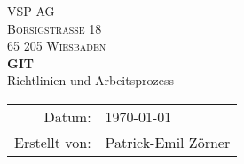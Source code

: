 \documentclass[12pt,oneside,a4paper]{article}
\begin{document}
\begin{titlepage}
  \begin{center}
    {\textsc{VSP AG\\
        Borsigstraße 18\\
        65 205 Wiesbaden\\}}
    \vspace{25mm}
    {\Huge\textbf{GIT}}\\
    \vspace{1cm}
    {\LARGE Richtlinien und Arbeitsprozess}\\[1.4ex]
    \vspace{10cm}
    \begin{tabular}{rl}
      Datum:&\quad \today \\
      Erstellt von:&\quad Patrick-Emil Zörner\\
    \end{tabular}
  \end{center}
\end{titlepage}
\tableofcontents
\newpage
{}


\end{document}

